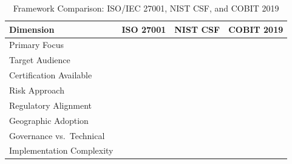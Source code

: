 \begin{table}[H]

\centering

\caption{Framework Comparison: ISO/IEC 27001, NIST CSF, and COBIT 2019}

\label{tab:framework-comparison}

\begin{tabularx}{\textwidth}{
l
X
X
X
}

\toprule

Dimension &
ISO 27001 &
NIST CSF &
COBIT 2019 \\

\midrule

Primary Focus &&&\\

Target Audience &&&\\

Certification Available &&&\\

Risk Approach &&&\\

Regulatory Alignment &&&\\

Geographic Adoption &&&\\

Governance vs.\ Technical &&&\\

Implementation Complexity &&&\\

\bottomrule

\end{tabularx}

\end{table}
